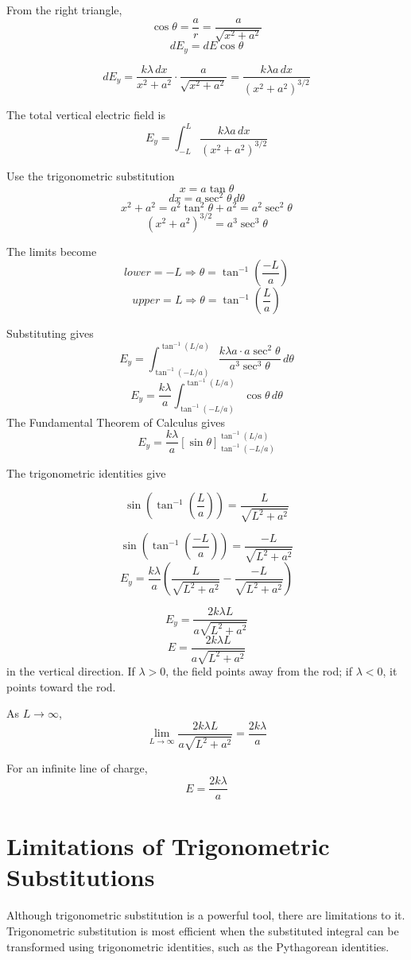 \documentclass[12pt]{article}
\begin{document}
From the right triangle,
\[
\cos\theta=\frac{a}{r}
=
\frac{a}{\sqrt{x^2+a^2}}
\]
\[
dE_y=dE\cos\theta
\]

\[
dE_y
=
\frac{k\lambda\,dx}{x^2+a^2}
\cdot
\frac{a}{\sqrt{x^2+a^2}}
=
\frac{k\lambda a\,dx}{(x^2+a^2)^{3/2}}
\]

The total vertical electric field is
\[
E_y
=
\int_{-L}^{L}
\frac{k\lambda a\,dx}{(x^2+a^2)^{3/2}}
\]

Use the trigonometric substitution
\[
x=a\tan\theta
\]
\[
dx=a\sec^2\theta\,d\theta
\]
\[
x^2+a^2
=
a^2\tan^2\theta+a^2
=
a^2\sec^2\theta
\]
\[
(x^2+a^2)^{3/2}
=
a^3\sec^3\theta
\]

The limits become
\[
lower=-L \Rightarrow \theta=\tan^{-1}\left(\frac{-L}{a}\right)
\]
\[
upper=L \Rightarrow \theta=\tan^{-1}\left(\frac{L}{a}\right)
\]

Substituting gives
\[
E_y
=
\int_{\tan^{-1}(-L/a)}^{\tan^{-1}(L/a)}
\frac{k\lambda a\cdot a\sec^2\theta}{a^3\sec^3\theta}
\,d\theta
\]
\[
E_y
=
\frac{k\lambda}{a}
\int_{\tan^{-1}(-L/a)}^{\tan^{-1}(L/a)}
\cos\theta\,d\theta
\]
The Fundamental Theorem of Calculus gives
\[
E_y
=
\frac{k\lambda}{a}
\left[\sin\theta\right]_{\tan^{-1}(-L/a)}^{\tan^{-1}(L/a)}
\]

The trigonometric identities give

\[
\sin\left(\tan^{-1}\left(\frac{L}{a}\right)\right)
=
\frac{L}{\sqrt{L^2+a^2}}
\]

\[
\sin\left(\tan^{-1}\left(\frac{-L}{a}\right)\right)
=
\frac{-L}{\sqrt{L^2+a^2}}
\]
\[
E_y
=
\frac{k\lambda}{a}
\left(
\frac{L}{\sqrt{L^2+a^2}}
-
\frac{-L}{\sqrt{L^2+a^2}}
\right)
\]

\[
E_y
=
\frac{2k\lambda L}{a\sqrt{L^2+a^2}}
\]
\[
\boxed{
E=\frac{2k\lambda L}{a\sqrt{L^2+a^2}}
}
\]
in the vertical direction. If \(\lambda>0\), the field points away from the rod; if \(\lambda<0\), it points toward the rod.

As \(L\to\infty\),
\[
\lim_{L\to\infty}
\frac{2k\lambda L}{a\sqrt{L^2+a^2}}
=
\frac{2k\lambda}{a}
\]

For an infinite line of charge,
\[
\boxed{
E=\frac{2k\lambda}{a}
}
\]

\section{Limitations of Trigonometric Substitutions}

Although trigonometric substitution is a powerful tool, there are limitations to it. Trigonometric substitution is most efficient when the substituted integral can be transformed using trigonometric identities, such as the Pythagorean identities.
\end{document}

